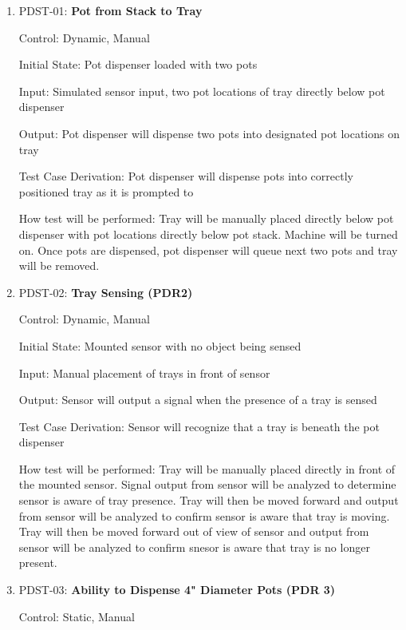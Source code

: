 \documentclass[12pt, titlepage]{article}
\begin{document}
\begin{enumerate}
 
  \item{PDST-01: \textbf{Pot from Stack to Tray}}
  
  Control: Dynamic, Manual
            
  Initial State: Pot dispenser loaded with two pots
            
  Input: Simulated sensor input, two pot locations of tray directly below pot dispenser
            
  Output: Pot dispenser will dispense two pots into designated pot locations on tray
  
  Test Case Derivation: Pot dispenser will dispense pots into correctly positioned tray as it is prompted to
            
  How test will be performed: Tray will be manually placed directly below pot dispenser with pot locations 
  directly below pot stack. Machine will be turned on. Once pots are dispensed, pot dispenser will 
  queue next two pots and tray will be removed.\\

  \item{PDST-02: \textbf{Tray Sensing (PDR2)}}
  
  Control: Dynamic, Manual
            
  Initial State: Mounted sensor with no object being sensed
            
  Input: Manual placement of trays in front of sensor
            
  Output: Sensor will output a signal when the presence of a tray is sensed
  
  Test Case Derivation: Sensor will recognize that a tray is beneath the pot dispenser
            
  How test will be performed: Tray will be manually placed directly in front of the mounted sensor. Signal 
  output from sensor will be analyzed to determine sensor is aware of tray presence. Tray will then be 
  moved forward and output from sensor will be analyzed to confirm sensor is aware that tray is moving. 
  Tray will then be moved forward out of view of sensor and output from sensor will be analyzed to confirm 
  snesor is aware that tray is no longer present.\\

  \item{PDST-03: \textbf{Ability to Dispense 4" Diameter Pots (PDR 3)}}
  
  Control: Static, Manual


\end{enumerate}
\end{document}
